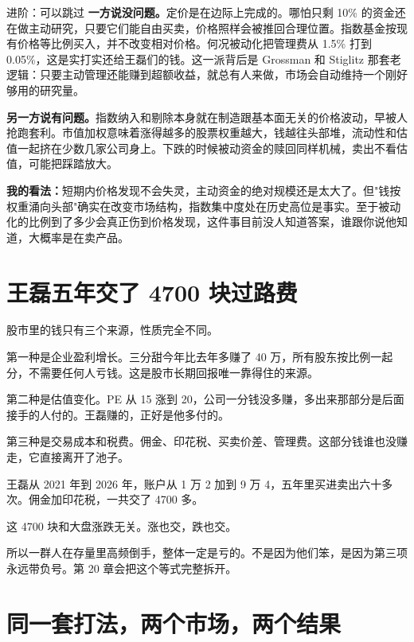 \begin{deepbox}{进阶：可以跳过}
\textbf{一方说没问题。}定价是在边际上完成的。哪怕只剩 10\% 的资金还在做主动研究，只要它们能自由买卖，价格照样会被推回合理位置。指数基金按现有价格等比例买入，并不改变相对价格。何况被动化把管理费从 1.5\% 打到 0.05\%，这是实打实还给王磊们的钱。这一派背后是 Grossman 和 Stiglitz 那套老逻辑：只要主动管理还能赚到超额收益，就总有人来做，市场会自动维持一个刚好够用的研究量。

\textbf{另一方说有问题。}指数纳入和剔除本身就在制造跟基本面无关的价格波动，早被人抢跑套利。市值加权意味着涨得越多的股票权重越大，钱越往头部堆，流动性和估值一起挤在少数几家公司身上。下跌的时候被动资金的赎回同样机械，卖出不看估值，可能把踩踏放大。

\textbf{我的看法：}短期内价格发现不会失灵，主动资金的绝对规模还是太大了。但"钱按权重涌向头部"确实在改变市场结构，指数集中度处在历史高位是事实。至于被动化的比例到了多少会真正伤到价格发现，这件事目前没人知道答案，谁跟你说他知道，大概率是在卖产品。

\end{deepbox}

\section{王磊五年交了 4700 块过路费}

股市里的钱只有三个来源，性质完全不同。

第一种是企业盈利增长。三分甜今年比去年多赚了 40 万，所有股东按比例一起分，不需要任何人亏钱。这是股市长期回报唯一靠得住的来源。

第二种是估值变化。PE 从 15 涨到 20，公司一分钱没多赚，多出来那部分是后面接手的人付的。王磊赚的，正好是他多付的。

第三种是交易成本和税费。佣金、印花税、买卖价差、管理费。这部分钱谁也没赚走，它直接离开了池子。

王磊从 2021 年到 2026 年，账户从 1 万 2 加到 9 万 4，五年里买进卖出六十多次。佣金加印花税，一共交了 4700 多。

这 4700 块和大盘涨跌无关。涨也交，跌也交。

所以一群人在存量里高频倒手，整体一定是亏的。不是因为他们笨，是因为第三项永远带负号。第 20 章会把这个等式完整拆开。

\section{同一套打法，两个市场，两个结果}

